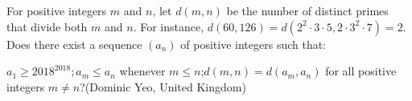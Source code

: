 For positive integers $m$ and $n$,  let $d(m, n)$ be the number of distinct primes that divide both $m$ and $n$. For instance, $d(60, 126) = d(2^2 \cdot 3 \cdot 5, 2 \cdot 3^2 \cdot 7) = 2.$ Does there exist a sequence $(a_n)$ of positive integers such that:

$a_1 \geq 2018^{2018};$$a_m \leq a_n$ whenever $m \leq n$;$d(m, n) = d(a_m, a_n)$ for all positive integers $m\neq n$?(Dominic Yeo, United Kingdom)